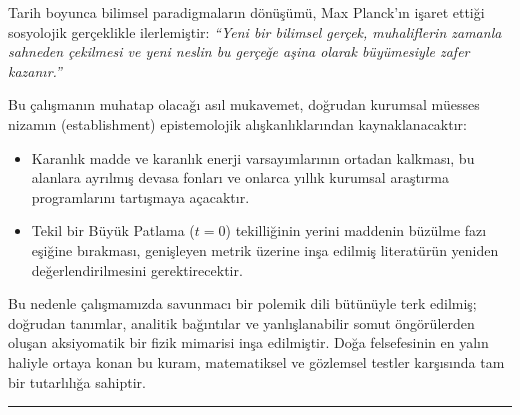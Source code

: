 Tarih boyunca bilimsel paradigmaların dönüşümü, Max Planck'ın işaret ettiği sosyolojik gerçeklikle ilerlemiştir: \textit{``Yeni bir bilimsel gerçek, muhaliflerin zamanla sahneden çekilmesi ve yeni neslin bu gerçeğe aşina olarak büyümesiyle zafer kazanır.''}

Bu çalışmanın muhatap olacağı asıl mukavemet, doğrudan kurumsal müesses nizamın (establishment) epistemolojik alışkanlıklarından kaynaklanacaktır:
\begin{itemize}
    \item Karanlık madde ve karanlık enerji varsayımlarının ortadan kalkması, bu alanlara ayrılmış devasa fonları ve onlarca yıllık kurumsal araştırma programlarını tartışmaya açacaktır.
    \item Tekil bir Büyük Patlama ($t=0$) tekilliğinin yerini maddenin büzülme fazı eşiğine bırakması, genişleyen metrik üzerine inşa edilmiş literatürün yeniden değerlendirilmesini gerektirecektir.
\end{itemize}
Bu nedenle çalışmamızda savunmacı bir polemik dili bütünüyle terk edilmiş; doğrudan tanımlar, analitik bağıntılar ve yanlışlanabilir somut öngörülerden oluşan aksiyomatik bir fizik mimarisi inşa edilmiştir. Doğa felsefesinin en yalın haliyle ortaya konan bu kuram, matematiksel ve gözlemsel testler karşısında tam bir tutarlılığa sahiptir.

\vspace{1.5em}
\hrule
\vspace{1.5em}
